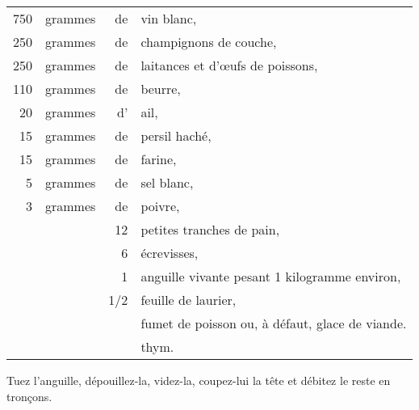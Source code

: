 \footnotesize
\begin{longtable}{rrrp{16em}}
    750 & grammes & de  & vin blanc,                                                                      \\
    250 & grammes & de  & champignons de couche,                                                          \\
    250 & grammes & de  & laitances et d'œufs de poissons,                                                \\
    110 & grammes & de  & beurre,                                                                         \\
     20 & grammes & d'  & ail,                                                                            \\
     15 & grammes & de  & persil haché,                                                                   \\
     15 & grammes & de  & farine,                                                                         \\
      5 & grammes & de  & sel blanc,                                                                      \\
      3 & grammes & de  & poivre,                                                                         \\
        &         & 12  & petites tranches de pain,                                                       \\
        &         &  6  & écrevisses,                                                                     \\
        &         &  1  & anguille vivante pesant 1 kilogramme environ,                                   \\
        &         & 1/2 & feuille de laurier,                                                             \\
        &         &     & fumet de poisson ou, à défaut, glace de viande.                                 \\
        &         &     & thym.                                                                           \\
\end{longtable}
\normalsize

Tuez l'anguille, dépouillez-la, videz-la, coupez-lui la tête et débitez le
reste en tronçons.


